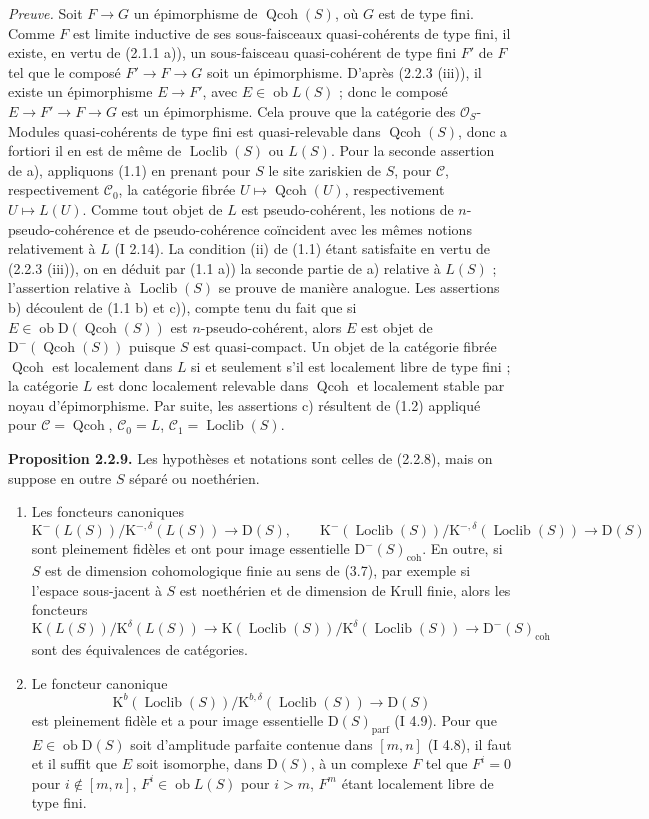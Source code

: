 \documentclass[11pt]{article}
\providecommand{\Loclib}{\operatorname{Loclib}}
\providecommand{\Qcoh}{\operatorname{Qcoh}}
\providecommand{\Ob}{\operatorname{ob}}
\providecommand{\coh}{\operatorname{coh}}
\providecommand{\parf}{\operatorname{parf}}
\begin{document}
\emph{Preuve.} Soit $F\to G$ un épimorphisme de $\Qcoh(S)$, où $G$ est de type fini. Comme $F$ est limite inductive de ses sous-faisceaux quasi-cohérents de type fini, il existe, en vertu de (2.1.1 a)), un sous-faisceau quasi-cohérent de type fini $F'$ de $F$ tel que le composé $F'\to F\to G$ soit un épimorphisme. D'après (2.2.3 (iii)), il existe un épimorphisme $E\to F'$, avec $E\in\Ob L(S)$ ; donc le composé $E\to F'\to F\to G$ est un épimorphisme. Cela prouve que la catégorie des $\mathcal O_S$-Modules quasi-cohérents de type fini est quasi-relevable dans $\Qcoh(S)$, donc a fortiori il en est de même de $\Loclib(S)$ ou $L(S)$. Pour la seconde assertion de a), appliquons (1.1) en prenant pour $S$ le site zariskien de $S$, pour $\mathcal C$, respectivement $\mathcal C_0$, la catégorie fibrée $U\mapsto\Qcoh(U)$, respectivement $U\mapsto L(U)$. Comme tout objet de $L$ est pseudo-cohérent, les notions de $n$-pseudo-cohérence et de pseudo-cohérence coïncident avec les mêmes notions relativement à $L$ (I 2.14). La condition (ii) de (1.1) étant satisfaite en vertu de (2.2.3 (iii)), on en déduit par (1.1 a)) la seconde partie de a) relative à $L(S)$ ; l'assertion relative à $\Loclib(S)$ se prouve de manière analogue. Les assertions b) découlent de (1.1 b) et c)), compte tenu du fait que si $E\in\Ob\mathrm D(\Qcoh(S))$ est $n$-pseudo-cohérent, alors $E$ est objet de $\mathrm D^{-}(\Qcoh(S))$ puisque $S$ est quasi-compact. Un objet de la catégorie fibrée $\Qcoh$ est localement dans $L$ si et seulement s'il est localement libre de type fini ; la catégorie $L$ est donc localement relevable dans $\Qcoh$ et localement stable par noyau d'épimorphisme. Par suite, les assertions c) résultent de (1.2) appliqué pour $\mathcal C=\Qcoh$, $\mathcal C_0=L$, $\mathcal C_1=\Loclib(S)$.

\textbf{Proposition 2.2.9.} Les hypothèses et notations sont celles de (2.2.8), mais on suppose en outre $S$ séparé ou noethérien.
\begin{enumerate}[label=\alph*)]
\item Les foncteurs canoniques
\[
\mathrm K^{-}(L(S))/\mathrm K^{-,\delta}(L(S))\longrightarrow\mathrm D(S),
\qquad
\mathrm K^{-}(\Loclib(S))/\mathrm K^{-,\delta}(\Loclib(S))\longrightarrow\mathrm D(S)
\]
sont pleinement fidèles et ont pour image essentielle $\mathrm D^{-}(S)_{\coh}$. En outre, si $S$ est de dimension cohomologique finie au sens de (3.7), par exemple si l'espace sous-jacent à $S$ est noethérien et de dimension de Krull finie, alors les foncteurs
\[
\mathrm K(L(S))/\mathrm K^{\delta}(L(S))\longrightarrow
\mathrm K(\Loclib(S))/\mathrm K^{\delta}(\Loclib(S))\longrightarrow
\mathrm D^{-}(S)_{\coh}
\]
sont des équivalences de catégories.
\item Le foncteur canonique
\[
\mathrm K^b(\Loclib(S))/\mathrm K^{b,\delta}(\Loclib(S))\longrightarrow\mathrm D(S)
\]
est pleinement fidèle et a pour image essentielle $\mathrm D(S)_{\parf}$ (I 4.9). Pour que $E\in\Ob\mathrm D(S)$ soit d'amplitude parfaite contenue dans $[m,n]$ (I 4.8), il faut et il suffit que $E$ soit isomorphe, dans $\mathrm D(S)$, à un complexe $F$ tel que $F^i=0$ pour $i\notin[m,n]$, $F^i\in\Ob L(S)$ pour $i>m$, $F^m$ étant localement libre de type fini.
\end{enumerate}
\end{document}

